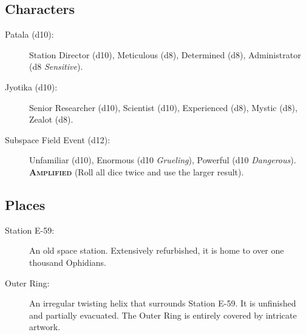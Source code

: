 \documentclass[11pt, a5paper, parskip=half-, DIV=12]{scrartcl}
\begin{document}
\newpage

\subsection*{Characters}
\begin{description}
	\item[Patala (d10):] Station Director (d10), Meticulous (d8), Determined (d8), Administrator (d8 \textit{Sensitive}).
	\item[Jyotika (d10):] Senior Researcher (d10), Scientist (d10), Experienced (d8), Mystic (d8), Zealot (d8).
	\item[Subspace Field Event (d12):] Unfamiliar (d10), Enormous (d10 \textit{Grueling}), Powerful (d10 \textit{Dangerous}). \textbf{\textsc{Amplified}} (Roll all dice twice and use the larger result).
\end{description}

\subsection*{Places}
\begin{description}
	\item[Station E-59:] An old space station.
	Extensively refurbished,
	it is home to over one thousand Ophidians.
	\item[Outer Ring:] An irregular twisting helix that surrounds Station E-59. It is unfinished and partially evacuated.
	The Outer Ring is entirely covered by intricate artwork.
\end{description}
\end{document}
